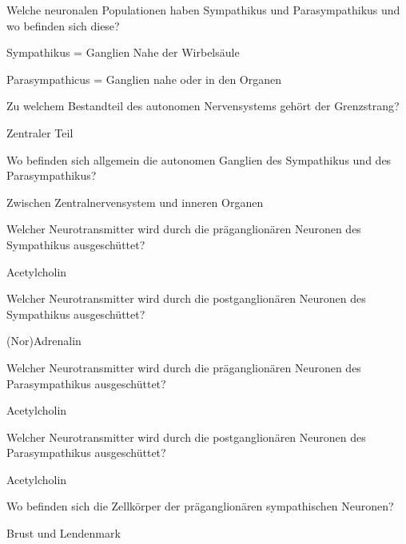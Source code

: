\documentclass[10pt, a4paper]{exam}
\newcommand\Warning{%
 \makebox[1.4em][c]{%
 \makebox[0pt][c]{\raisebox{.1em}{\small!}}%
 \makebox[0pt][c]{\color{red}\Large$\bigtriangleup$}}}%
\begin{document}
\begin{questions}
  \question Welche neuronalen Populationen haben Sympathikus und Parasympathikus und wo befinden sich diese?
  \begin{solution}
    \begin{itemize*}
      \item Sympathikus = Ganglien Nahe der Wirbelsäule  \Warning
      \item Parasympathicus = Ganglien nahe oder in den Organen  \Warning
    \end{itemize*}
  \end{solution}

  \question Zu welchem Bestandteil des autonomen Nervensystems gehört der Grenzstrang?
  \begin{solution}
    Zentraler Teil  \Warning
  \end{solution}

  \question Wo befinden sich allgemein die autonomen Ganglien des Sympathikus und des Parasympathikus?
  \begin{solution}
    Zwischen Zentralnervensystem und inneren Organen
  \end{solution}

  \question Welcher Neurotransmitter wird durch die präganglionären Neuronen des Sympathikus ausgeschüttet?
  \begin{solution}
    Acetylcholin
  \end{solution}

  \question Welcher Neurotransmitter wird durch die postganglionären Neuronen des Sympathikus ausgeschüttet?
  \begin{solution}
    (Nor)Adrenalin
  \end{solution}

  \question Welcher Neurotransmitter wird durch die präganglionären Neuronen des Parasympathikus ausgeschüttet?
  \begin{solution}
    Acetylcholin
  \end{solution}

  \question Welcher Neurotransmitter wird durch die postganglionären Neuronen des Parasympathikus ausgeschüttet?
  \begin{solution}
    Acetylcholin
  \end{solution}

  \question Wo befinden sich die Zellkörper der präganglionären sympathischen Neuronen?
  \begin{solution}
    Brust und Lendenmark
  \end{solution}


\end{questions}
\end{document}
